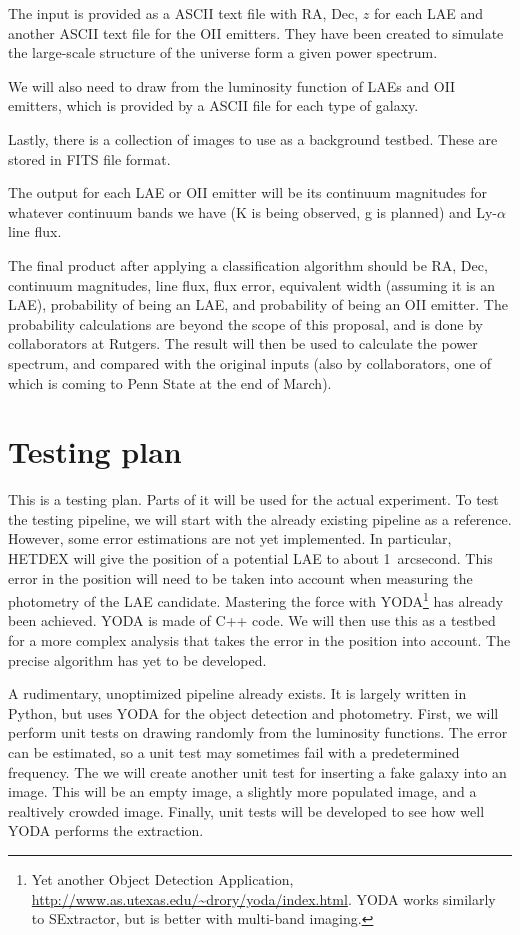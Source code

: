 \documentclass[11pt]{article}
\begin{document}
The input is provided as a ASCII text file with RA, Dec, $z$ for each LAE and
another ASCII text file for the OII emitters. They have been created to
simulate the large-scale structure of the universe form a given power spectrum.

We will also need to draw from the luminosity function of LAEs and OII
emitters, which is provided by a ASCII file for each type of galaxy.

Lastly, there is a collection of images to use as a background testbed. These
are stored in FITS file format.

The output for each LAE or OII emitter will be its continuum magnitudes for
whatever continuum bands we have (K is being observed, g is planned) and
Ly-$\alpha$ line flux.

The final product after applying a classification algorithm should be RA, Dec,
continuum magnitudes, line flux, flux error, equivalent width (assuming it is
an LAE), probability of being an LAE, and probability of being an OII emitter.
The probability calculations are beyond the scope of this proposal, and is done
by collaborators at Rutgers. The result will then be used to calculate the
power spectrum, and compared with the original inputs (also by collaborators,
one of which is coming to Penn State at the end of March).


\section{Testing plan}

This is a testing plan. Parts of it will be used for the actual experiment. To
test the testing pipeline, we will start with the already existing pipeline as
a reference. However, some error estimations are not yet implemented. In
particular, HETDEX will give the position of a potential LAE to about
\SI{1}{arcsecond}. This error in the position will need to be taken into
account when measuring the photometry of the LAE candidate. Mastering the force
with YODA\footnote{Yet another Object Detection Application,
\url{http://www.as.utexas.edu/~drory/yoda/index.html}. YODA works similarly to
SExtractor, but is better with multi-band imaging.} has already been achieved.
YODA is made of C++ code. We will then use this as a testbed for a more complex
analysis that takes the error in the position into account. The precise
algorithm has yet to be developed.

A rudimentary, unoptimized pipeline already exists. It is largely written in
Python, but uses YODA for the object detection and photometry. First, we will
perform unit tests on drawing randomly from the luminosity functions. The error
can be estimated, so a unit test may sometimes fail with a predetermined
frequency. The we will create another unit test for inserting a fake galaxy
into an image. This will be an empty image, a slightly more populated image,
and a realtively crowded image. Finally, unit tests will be developed to see
how well YODA performs the extraction.
\end{document}
